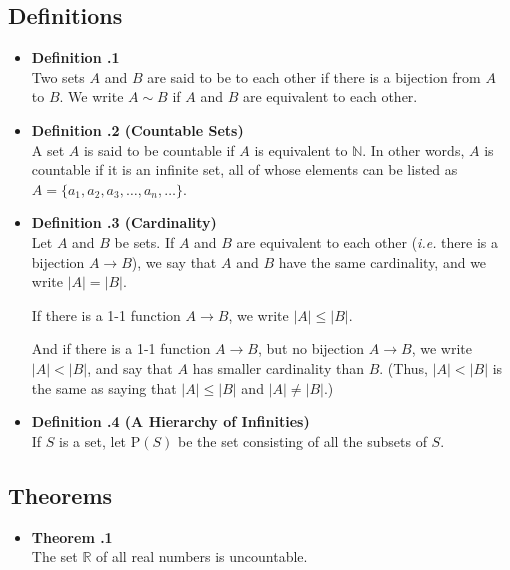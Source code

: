 \documentclass[a4paper,12pt]{article}
\newcommand{\defi}[1]{
    \item \textbf{Definition \thesection.#1}\\
}
\newcommand{\theo}[1]{
    \item \textbf{Theorem \thesection.#1}\\
}
\let\emph\relax %
\begin{document}
\subsection{Definitions}
\begin{itemize}
    \defi 1
    Two sets $A$ and $B$ are said to be \emph{equivalent} to each other if there is a
    bijection from $A$ to $B$. We write $A \sim B$ if $A$ and $B$ are equivalent to each
    other.
    
    \defi {2 (Countable Sets)}
    A set $A$ is said to be countable if $A$ is equivalent to $\mathbb{N}$. In other words,
    $A$ is countable if it is an infinite set, all of whose elements can be listed as
    $A = \{a_1, a_2, a_3, \ldots, a_n, \ldots\}$.
    
    \defi {3 (Cardinality)}
    Let $A$ and $B$ be sets. If $A$ and $B$ are equivalent to each other (\textit{i.e.}
    there is a bijection $A \to B$), we say that $A$ and $B$ have the same cardinality,
    and we write $|A| = |B|$.
    
    If there is a 1-1 function $A \to B$, we write $|A| \le |B|$.
    
    And if there is a 1-1 function $A \to B$, but no bijection $A \to B$, we write
    $|A| < |B|$, and say that $A$ has smaller cardinality than $B$. (Thus, $|A| < |B|$ is
    the same as saying that $|A| \le |B|$ and $|A| \ne |B|$.)
    
    \defi {4 (A Hierarchy of Infinities)}
    If $S$ is a set, let $\text{P}(S)$ be the set consisting of all the subsets of $S$.
\end{itemize}

\subsection{Theorems}
\begin{itemize}
    \theo 1
    The set $\mathbb{R}$ of all real numbers is uncountable.
\end{itemize}
\end{document}
